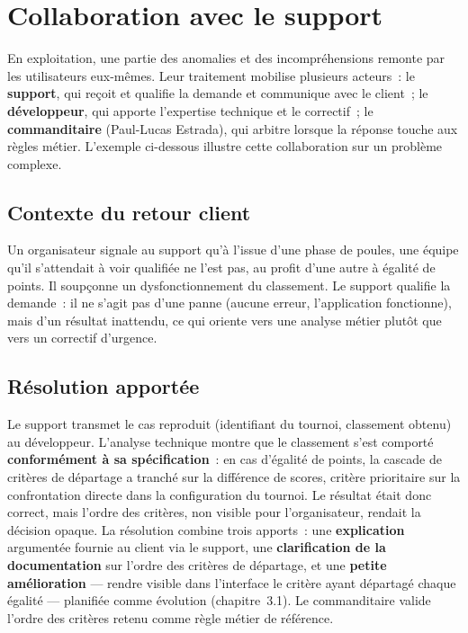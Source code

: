 \section{Collaboration avec le support}
\label{sec:support}

En exploitation, une partie des anomalies et des incompréhensions remonte par les utilisateurs eux-mêmes. Leur traitement mobilise plusieurs acteurs~: le \textbf{support}, qui reçoit et qualifie la demande et communique avec le client~; le \textbf{développeur}, qui apporte l'expertise technique et le correctif~; le \textbf{commanditaire} (Paul-Lucas Estrada), qui arbitre lorsque la réponse touche aux règles métier. L'exemple ci-dessous illustre cette collaboration sur un problème complexe.

\subsection{Contexte du retour client}
Un organisateur signale au support qu'à l'issue d'une phase de poules, une équipe qu'il s'attendait à voir qualifiée ne l'est pas, au profit d'une autre à égalité de points. Il soupçonne un dysfonctionnement du classement. Le support qualifie la demande~: il ne s'agit pas d'une panne (aucune erreur, l'application fonctionne), mais d'un résultat inattendu, ce qui oriente vers une analyse métier plutôt que vers un correctif d'urgence.

\subsection{Résolution apportée}
Le support transmet le cas reproduit (identifiant du tournoi, classement obtenu) au développeur. L'analyse technique montre que le classement s'est comporté \textbf{conformément à sa spécification}~: en cas d'égalité de points, la cascade de critères de départage a tranché sur la différence de scores, critère prioritaire sur la confrontation directe dans la configuration du tournoi. Le résultat était donc correct, mais l'ordre des critères, non visible pour l'organisateur, rendait la décision opaque. La résolution combine trois apports~: une \textbf{explication} argumentée fournie au client via le support, une \textbf{clarification de la documentation} sur l'ordre des critères de départage, et une \textbf{petite amélioration} — rendre visible dans l'interface le critère ayant départagé chaque égalité — planifiée comme évolution (chapitre~3.1). Le commanditaire valide l'ordre des critères retenu comme règle métier de référence.

